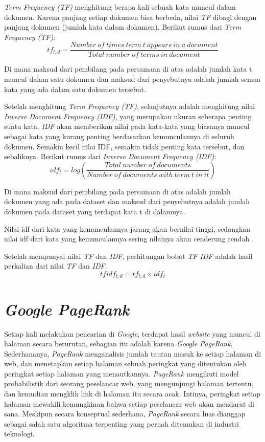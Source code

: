 \textit{Term Frequency (TF)} menghitung berapa kali sebuah kata muncul dalam dokumen. Karena panjang setiap dokumen bisa berbeda, nilai \textit{TF} dibagi dengan panjang dokumen (jumlah kata dalam dokumen). Berikut rumus dari \textit{Term Frequency (TF)}:
\begin{equation}
tf_{t,d} = \frac{Number\>of\>times\>term\>t\>appears\>in\>a\>document}{Total\>number\>of\>terms\>in\>document}
\end{equation}

Di mana maksud dari pembilang pada persamaan di atas adalah jumlah kata t muncul dalam satu dokumen dan maksud dari penyebutnya adalah jumlah semua kata yang ada dalam satu dokumen tersebut.

Setelah menghitung \textit{Term Frequency (TF)}, selanjutnya adalah menghitung nilai \textit{Inverse Document Frequency (IDF)}, yang merupakan ukuran seberapa penting suatu kata. \textit{IDF} akan memberikan nilai pada kata-kata yang biasanya muncul sebagai kata yang kurang penting berdasarkan kemunculannya di seluruh dokumen. Semakin kecil nilai IDF, semakin tidak penting kata tersebut, dan sebaliknya. Berikut rumus dari \textit{Inverse Document Frequency (IDF)}:
\begin{equation}
idf_{t} = log (\frac{Total\>number\>of\>documents}{Number\>of\>documents\>with\>term\>t\>in\>it})
\end{equation}

Di mana maksud dari pembilang pada persamaan di atas adalah jumlah dokumen yang ada pada dataset dan maksud dari penyebutnya adalah jumlah dokumen pada dataset yang terdapat kata t di dalamnya.

Nilai idf dari kata yang kemunculannya jarang akan bernilai tinggi, sedangkan nilai idf dari kata yang kemunculannya sering nilainya akan cenderung rendah \citep{manning2009anintroduction}.

Setelah mempunyai nilai \textit{TF} dan \textit{IDF}, perhitungan bobot \textit{TF IDF} adalah hasil perkalian dari nilai \textit{TF} dan \textit{IDF}.
\begin{equation}
tfidf_{t,d} = tf_{t,d} \times idf_{t}
\end{equation}

\section{\emph{Google PageRank}}
Setiap kali melakukan pencarian di \textit{Google}, terdapat hasil \textit{website} yang muncul di halaman secara berurutan, sebagian itu adalah karena \textit{Google PageRank}. Sederhananya, \textit{PageRank} menganalisis jumlah tautan masuk ke setiap halaman di web, dan menetapkan setiap halaman sebuah peringkat yang ditentukan oleh peringkat setiap halaman yang menautkannya. \textit{PageRank} mengikuti model probabilistik dari seorang peselancar web, yang mengunjungi halaman tertentu, dan kemudian mengklik link di halaman itu secara acak. Intinya, peringkat setiap halaman mewakili kemungkinan bahwa setiap peselancar web akan mendarat di sana. Meskipun secara konseptual sederhana, \textit{PageRank} secara luas dianggap sebagai salah satu algoritma terpenting yang pernah ditemukan di industri teknologi.

